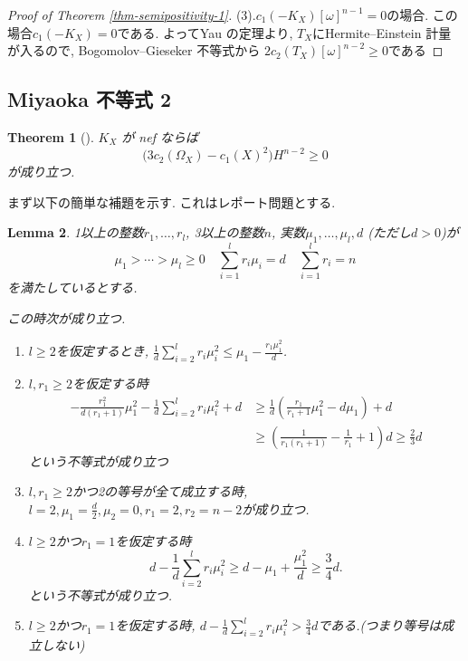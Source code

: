 \documentclass[dvipdfmx,a4paper,11pt]{article} %
\newtheorem{thm}{Theorem}[section]
\newtheorem{lem}[thm]{Lemma}
\theoremstyle{definition}
\theoremstyle{remark}
\numberwithin{equation}{section}
\begin{document}
\begin{proof}[Proof of Theorem \ref{thm-semipositivity-1}]
(3).$c_1(-K_X)[\omega]^{n-1}=0$の場合.
この場合$c_1(-K_X)=0$である. よってYau の定理より, $T_X$にHermite--Einstein 計量が入るので, Bogomolov--Gieseker 不等式から
$2c_2(T_X)[\omega]^{n-2} \ge 0$である
\end{proof}


\subsection{Miyaoka 不等式 2}

\begin{thm}[{\cite[Chapter 7]{Miy87}}]
\label{thm-semipositivity-2}
\(K_X\) が nef ならば
\[
\bigl(3c_2(\Omega_X)-c_1(X)^2\bigr)H^{n-2} \geq 0
\]
が成り立つ.
\end{thm}


まず以下の簡単な補題を示す. これはレポート問題とする.
\begin{lem}
\label{lem-miyaoka-2}
1以上の整数$r_1, \ldots, r_l$, 3以上の整数$n$, 実数$\mu_1, \ldots, \mu_l, d$ (ただし$d>0$)が
\[
\mu_1 > \cdots > \mu_l \geq 0
\quad
\sum_{i=1}^{l}r_i\mu_i=d
\quad 
\sum_{i=1}^{l}r_i=n
\]
を満たしているとする. 

この時次が成り立つ.
\begin{enumerate}
\item  $l\ge 2$を仮定するとき, $\frac{1}{d} \sum_{i=2}^{l}r_i \mu_i^2 \le \mu_1 - \frac{r_1 \mu_1^{2}}{d}$. 
\item $l, r_1\ge 2$を仮定する時
\begin{align*}
-\frac{r_1^2}{d(r_1+1)}\mu_1^2
-\frac{1}{d} \sum_{i=2}^{l}r_i \mu_i^2
+d
&\ge
\frac{1}{d}\left(
\frac{r_1}{r_1+1}\mu_1^2
-
d\mu_1
\right)
+d
\\
&\ge
\left(
\frac{1}{r_1(r_1+1)}-\frac{1}{r_1}+1
\right)d
\ge \frac{2}{3}d
\end{align*}
という不等式が成り立つ
\item $l, r_1\ge 2$かつ2の等号が全て成立する時, $l=2,\mu_1=\frac{d}{2}, \mu_2=0,r_1=2,r_2=n-2$が成り立つ.
\item $l\ge 2$かつ$r_1=1$を仮定する時
$$
d
-
\frac{1}{d} \sum_{i=2}^{l}r_i \mu_i^2 
\geq
d-\mu_1+\frac{\mu_1^2}{d} \geq
\frac{3}{4}d .
$$
という不等式が成り立つ.
\item $l\ge 2$かつ$r_1=1$を仮定する時, $d-\frac{1}{d} \sum_{i=2}^{l}r_i \mu_i^2 >\frac{3}{4}d $である.(つまり等号は成立しない) 
\end{enumerate}
\end{lem}
\end{document}
